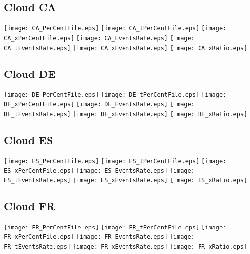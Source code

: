 \subsection{Cloud CA}
\texttt{[image: CA\_PerCentFile.eps]}
\texttt{[image: CA\_tPerCentFile.eps]}
\texttt{[image: CA\_xPerCentFile.eps]}
\texttt{[image: CA\_EventsRate.eps]}
\texttt{[image: CA\_tEventsRate.eps]}
\texttt{[image: CA\_xEventsRate.eps]}
\texttt{[image: CA\_xRatio.eps]}
\vspace{1ex}\\

\subsection{Cloud DE}
\texttt{[image: DE\_PerCentFile.eps]}
\texttt{[image: DE\_tPerCentFile.eps]}
\texttt{[image: DE\_xPerCentFile.eps]}
\texttt{[image: DE\_EventsRate.eps]}
\texttt{[image: DE\_tEventsRate.eps]}
\texttt{[image: DE\_xEventsRate.eps]}
\texttt{[image: DE\_xRatio.eps]}
\vspace{1ex}\\

\subsection{Cloud ES}
\texttt{[image: ES\_PerCentFile.eps]}
\texttt{[image: ES\_tPerCentFile.eps]}
\texttt{[image: ES\_xPerCentFile.eps]}
\texttt{[image: ES\_EventsRate.eps]}
\texttt{[image: ES\_tEventsRate.eps]}
\texttt{[image: ES\_xEventsRate.eps]}
\texttt{[image: ES\_xRatio.eps]}
\vspace{1ex}\\

\subsection{Cloud FR}
\texttt{[image: FR\_PerCentFile.eps]}
\texttt{[image: FR\_tPerCentFile.eps]}
\texttt{[image: FR\_xPerCentFile.eps]}
\texttt{[image: FR\_EventsRate.eps]}
\texttt{[image: FR\_tEventsRate.eps]}
\texttt{[image: FR\_xEventsRate.eps]}
\texttt{[image: FR\_xRatio.eps]}
\vspace{1ex}\\


